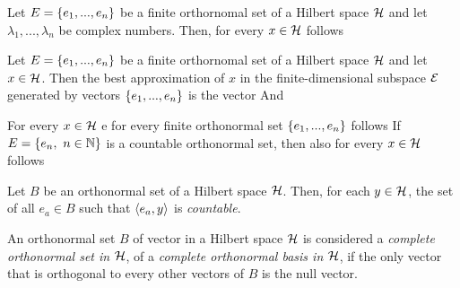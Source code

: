 \documentclass[oneside, 10pt, notitlepage]{book}
\begin{document}
\begin{proposition}
	Let \(E=\left\{e_1,...,e_n\right\}\) be a finite orthornomal set of a Hilbert space \(\mathcal{H}\) and let \(\lambda_1,...,\lambda_n\) be complex numbers. Then, for every \(x\in\mathcal{H}\) follows
\end{proposition}



\begin{proposition}
	Let \(E=\left\{e_1,...,e_n\right\}\) be a finite orthornomal set of a Hilbert space \(\mathcal{H}\) and let \(x\in \mathcal{H}\). Then the best approximation of \(x\) in the finite-dimensional subspace \(\mathcal{E}\) generated by vectors \(\left\{e_1,...,e_n\right\}\) is the vector
	And
\end{proposition}


\begin{proposition}
	For every \(x\in\mathcal{H}\) e for every finite orthonormal set \(\left\{e_1,...,e_n\right\}\) follows
	If \(E=\left\{e_n,\ n\in\mathbb{N}\right\}\) is a countable orthonormal set, then also for every \(x\in\mathcal{H}\) follows
\end{proposition}



\begin{theorem}
	Let \(B\) be an orthonormal set of a Hilbert space \(\mathcal{H}\). Then, for each \(y\in \mathcal{H}\), the set of all \(e_a \in B\) such that \(\left\langle e_a,y \right\rangle\) is \emph{countable}.
\end{theorem}




\begin{definition}
	An orthonormal set \(B\) of vector in a Hilbert space \(\mathcal{H}\) is considered a \emph{complete orthonormal set in \(\mathcal{H}\)}, of a \emph{complete orthonormal basis in \(\mathcal{H}\)}, if the only vector that is orthogonal to every other vectors of \(B\) is the null vector.
\end{definition}
\end{document}
